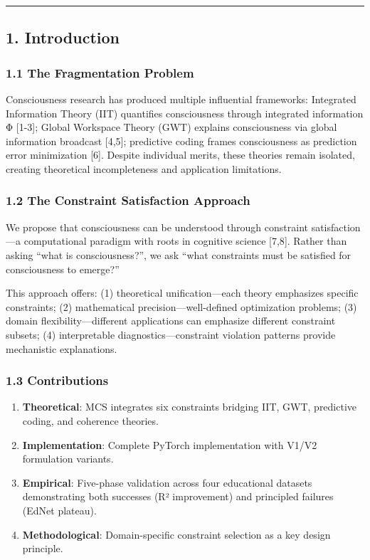 \documentclass[
]{article}
\providecommand{\tightlist}{%
  \setlength{\itemsep}{0pt}\setlength{\parskip}{0pt}}
\begin{document}
\begin{center}\rule{0.5\linewidth}{0.5pt}\end{center}

\subsection{1. Introduction}\label{introduction}

\subsubsection{1.1 The Fragmentation
Problem}\label{the-fragmentation-problem}

Consciousness research has produced multiple influential frameworks:
Integrated Information Theory (IIT) quantifies consciousness through
integrated information Φ {[}1-3{]}; Global Workspace Theory (GWT)
explains consciousness via global information broadcast {[}4,5{]};
predictive coding frames consciousness as prediction error minimization
{[}6{]}. Despite individual merits, these theories remain isolated,
creating theoretical incompleteness and application limitations.

\subsubsection{1.2 The Constraint Satisfaction
Approach}\label{the-constraint-satisfaction-approach}

We propose that consciousness can be understood through constraint
satisfaction---a computational paradigm with roots in cognitive science
{[}7,8{]}. Rather than asking ``what is consciousness?'', we ask ``what
constraints must be satisfied for consciousness to emerge?''

This approach offers: (1) theoretical unification---each theory
emphasizes specific constraints; (2) mathematical
precision---well-defined optimization problems; (3) domain
flexibility---different applications can emphasize different constraint
subsets; (4) interpretable diagnostics---constraint violation patterns
provide mechanistic explanations.

\subsubsection{1.3 Contributions}\label{contributions}

\begin{enumerate}
\def\labelenumi{\arabic{enumi}.}
\tightlist
\item
  \textbf{Theoretical}: MCS integrates six constraints bridging IIT,
  GWT, predictive coding, and coherence theories.
\item
  \textbf{Implementation}: Complete PyTorch implementation with V1/V2
  formulation variants.
\item
  \textbf{Empirical}: Five-phase validation across four educational
  datasets demonstrating both successes (R² improvement) and principled
  failures (EdNet plateau).
\item
  \textbf{Methodological}: Domain-specific constraint selection as a key
  design principle.
\end{enumerate}
\end{document}
